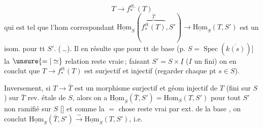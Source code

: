 \[
T\longrightarrow f_*^{\mathrm{ét.}}(T)
\]
qui est tel que l'hom correspondant $\underline{\mathrm{Hom}}_S(\overbrace{f_*^{\mathrm{ét}}(T)}^{\bar T},S')\longrightarrow\underline{\mathrm{Hom}}_S(T,S')$ est un isom. pour tt $S'$. (\,\dots). Il en résulte que pour tt   de base (p.    $S=\operatorname{Spec}(\overline{k(s)})$] la $\unsure{=|\simeq}$ relation reste vraie\,; faisant $S'=S\times\underline I$ ($I$ un fini) on en conclut que $T\to f_*^{\mathrm{ét}}(T)$ est surjectif et   injectif (regarder   chaque pt $s\in S$).

Inversement, si $T\to\bar T$ est un morphisme surjectif et géom injectif de $T$ (fini  sur $S$) sur $\bar T$ rev. étale de $S$, alors on a $\underline{\mathrm{Hom}}_S(\bar T,S')=\mathrm{Hom}_S(T,S')$ pour tout $S'$ non ramifié sur $S$ [] et comme la $=$ chose reste vrai par ext. de la base , on conclut  $\underline{\mathrm{Hom}}_S(\bar T,S')\xrightarrow{\sim}\underline{\mathrm{Hom}}_S(T,S')$, i.e. 

